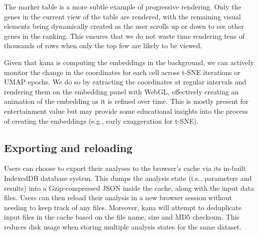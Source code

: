 \documentclass{article}
\begin{document}
The marker table is a more subtle example of progressive rendering.
Only the genes in the current view of the table are rendered, with the remaining visual elements being dynamically created as the user scrolls up or down to see other genes in the ranking.
This ensures that we do not waste time rendering tens of thousands of rows when only the top few are likely to be viewed.

Given that kana is computing the embeddings in the background, we can actively monitor the change in the coordinates for each cell across t-SNE iterations or UMAP epochs.
We do so by extracting the coordinates at regular intervals and rendering them on the embedding panel with WebGL,
effectively creating an animation of the embedding as it is refined over time.
This is mostly present for entertainment value but may provide some educational insights into the process of creating the embeddings (e.g., early exaggeration for t-SNE).

% 

\subsection{Exporting and reloading}

Users can choose to export their analyses to the browser's cache via its in-built IndexedDB database system.
This dumps the analysis state (i.e., parameters and results) into a Gzip-compressed JSON inside the cache, along with the input data files.
Users can then reload their analysis in a new browser session without needing to keep track of any files.
Moreover, kana will attempt to deduplicate input files in the cache based on the file name, size and MD5 checksum.
This reduces disk usage when storing multiple analysis states for the same dataset. 
\end{document}
